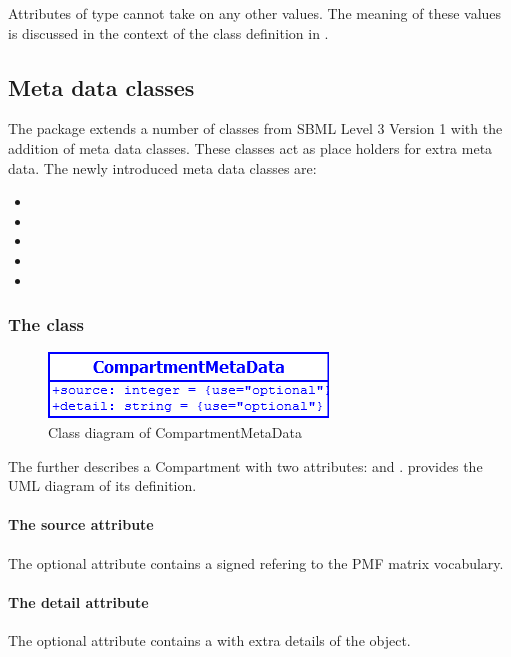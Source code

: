 Attributes of type  cannot take on any other values. The
meaning of these values is discussed in the context of the \RuleMetaData class
definition in .

\subsection{Meta data classes}
The \Pmf package extends a number of classes from SBML Level 3 Version 1 with
the addition of meta data classes. These classes act as place holders for extra
meta data. The newly introduced meta data classes are:
\begin{itemize}
	\item \CompartmentMetaData
	\item \ModelMetaData
	\item \ParameterMetaData
	\item \RuleMetaData
	\item \SpeciesMetaData
\end{itemize}


\subsubsection{The  class}
\begin{figure}[h]
	\includegraphics[scale=0.8]{img/CompartmentMetaData}
	\caption{Class diagram of CompartmentMetaData}
	\label{CompartmentMetaData}
\end{figure}

\label{compartmentmetadata-class}
The \CompartmentMetaData further describes a Compartment with two attributes:
 and .  provides the UML
diagram of its definition.

\paragraph{The source attribute}
The optional attribute  contains a signed 
refering to the PMF matrix vocabulary.

\paragraph{The detail attribute}
The optional attribute  contains a  with extra
details of the \Compartment object.

